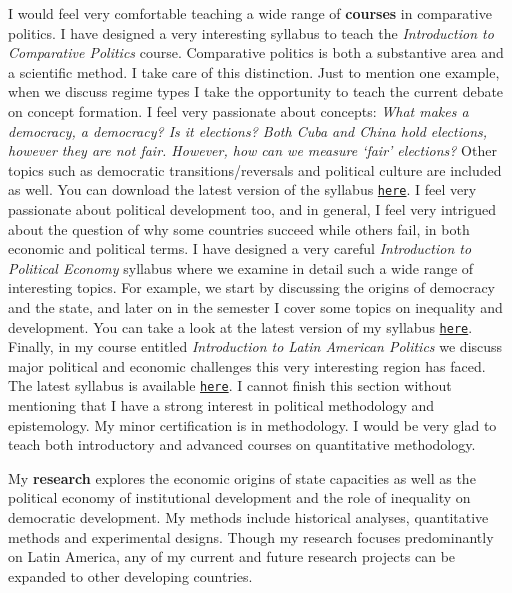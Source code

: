 \documentclass[10pt,stdletter,dateno,sigleft]{newlfm} %
\begin{document}
\begin{newlfm}
I would feel very comfortable teaching a wide range of {\bf courses} in comparative politics. I have designed a very interesting syllabus to teach the \emph{Introduction to Comparative Politics} course. Comparative politics is both a substantive area and a scientific method. I take care of this distinction. Just to mention one example, when we discuss regime types I take the opportunity to teach the current debate on concept formation. I feel very passionate about concepts: \emph{What makes a democracy, a democracy? Is it elections? Both Cuba and China hold elections, however they are not fair. However, how can we measure `fair' elections?} Other topics such as democratic transitions/reversals and political culture are included as well. You can download the latest version of the syllabus \href{https://github.com/hbahamonde/Comparative_Politics_UGRAD/raw/master/Bahamonde_Comparative_Politics_Syllabus_UGRAD.pdf}{\texttt{here}}. I feel very passionate about political development too, and in general, I feel very intrigued about the question of why some countries succeed while others fail, in both economic and political terms. I have designed a very careful \emph{Introduction to Political Economy} syllabus where we examine in detail such a wide range of interesting topics. For example, we start by discussing the origins of democracy and the state, and later on in the semester I cover some topics on inequality and development. You can take a look at the latest version of my syllabus \href{https://github.com/hbahamonde/Political-Economy-Intro-UGrad/raw/master/Pol_Econ_Dev_Syllabus_UGRAD.pdf}{\texttt{here}}. Finally, in my course entitled \emph{Introduction to Latin American Politics} we discuss major political and economic challenges this very interesting region has faced. The latest syllabus is available \href{https://github.com/hbahamonde/Latin_American_Politics_UGRAD/raw/master/Bahamonde_Latin_American_Politics_Syllabus_UGRAD.pdf}{\texttt{here}}. I cannot finish this section without mentioning that I have a strong interest in political methodology and epistemology. My minor certification is in methodology. I would be very glad to teach both introductory and advanced courses on quantitative methodology.


My {\bf research} explores the economic origins of state capacities as well as the political economy of institutional development and the role of inequality on democratic development. My methods include historical analyses, quantitative methods and experimental designs. Though my research focuses predominantly on Latin America, any of my current and future research projects can be expanded to other developing countries. 



\end{newlfm}
\end{document}

